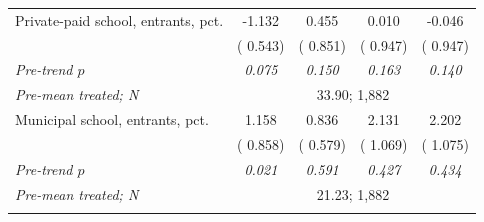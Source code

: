 \begin{tabular}{lcccc}
\addlinespace
Private-paid school, entrants, pct. &  -1.132\sym{**} &   0.455 &   0.010 &  -0.046 \\
 & ( 0.543) & ( 0.851) & ( 0.947) & ( 0.947) \\
\quad \textit{Pre-trend \(p\)} & \textit{0.075} & \textit{0.150} & \textit{0.163} & \textit{0.140} \\
\quad \textit{Pre-mean treated; N} & \multicolumn{4}{c}{\scriptsize   33.90;  1,882} \\
\addlinespace
Municipal school, entrants, pct. &   1.158 &   0.836 &   2.131\sym{**} &   2.202\sym{**} \\
 & ( 0.858) & ( 0.579) & ( 1.069) & ( 1.075) \\
\quad \textit{Pre-trend \(p\)} & \textit{0.021} & \textit{0.591} & \textit{0.427} & \textit{0.434} \\
\quad \textit{Pre-mean treated; N} & \multicolumn{4}{c}{\scriptsize   21.23;  1,882} \\
\addlinespace
\bottomrule
\end{tabular}
